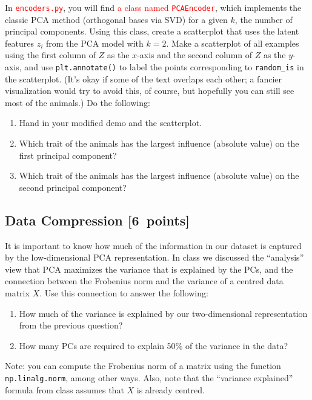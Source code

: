 \documentclass{article}
\newcommand{\blu}[1]{{\textcolor{blu}{#1}}}
\newcommand{\red}[1]{\textcolor{red}{#1}}
\let\ask\blu
\let\update\red
\newenvironment{asking}{\begingroup\color{blu}}{\endgroup}
\newcommand\pts[1]{\textcolor{pointscolour}{[#1~points]}}
\begin{document}
In \update{\texttt{encoders.py}}, you will find \update{a class named \texttt{PCAEncoder}}, which implements the classic PCA method (orthogonal bases via SVD) for a given $k$, the number of principal components. Using this class, create a scatterplot that uses the latent features $z_i$ from the PCA model with $k=2$.
Make a scatterplot of all examples using the first column of $Z$ as the $x$-axis and the second column of $Z$ as the $y$-axis, and use \texttt{plt.annotate()} to label the points corresponding to \verb|random_is| in the scatterplot.
(It's okay if some of the text overlaps each other; a fancier visualization would try to avoid this, of course, but hopefully you can still see most of the animals.)
Do the following:
\begin{asking}
	\begin{enumerate}
		\item  Hand in your modified demo and the scatterplot.
		\item Which trait of the animals has the largest influence (absolute value) on the first principal component?
		\item Which trait of the animals has the largest influence (absolute value) on the second principal component?
    \end{enumerate}
\end{asking}


\subsection{Data Compression \pts{6}}

It is important to know how much of the information in our dataset is captured by the low-dimensional PCA representation.
In class we discussed the ``analysis'' view that PCA maximizes the variance that is explained by the PCs, and the connection between the Frobenius norm and the variance of a centred data matrix $X$.
Use this connection to answer the following:
\begin{enumerate}
	\item \ask{How much of the variance is explained by our two-dimensional representation from the previous question?}
	\item \ask{How many PCs are required to explain 50\% of the variance in the data?}
\end{enumerate}
Note: you can compute the Frobenius norm of a matrix using the function \texttt{np.linalg.norm}, among other ways. Also, note that the ``variance explained'' formula from class assumes that $X$ is already centred.
\end{document}
